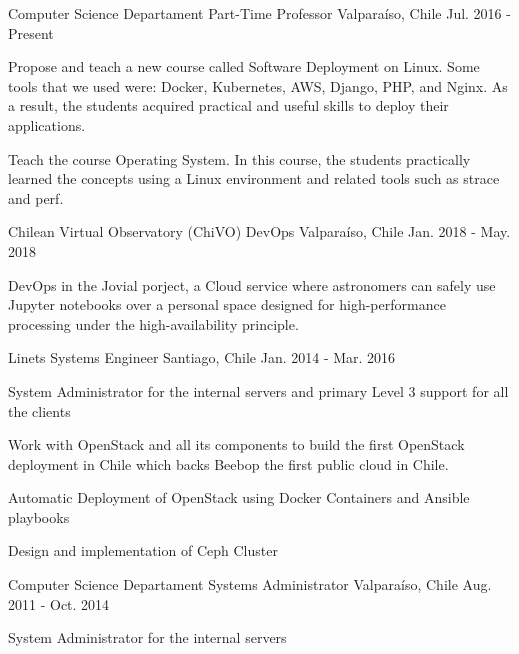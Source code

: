 \begin{cventries}
  \cventry
    {Computer Science Departament}
    {Part-Time Professor}
    {Valparaíso, Chile}
    {Jul. 2016 - Present}
    {
      \begin{cvitems}
        \item {Propose and teach a new course called Software Deployment on Linux. Some tools that we used were: Docker, Kubernetes, AWS, Django, PHP,  and Nginx. As a result, the students acquired practical and useful skills to deploy their applications.}
        \item {Teach the course Operating System. In this course, the students practically learned the concepts using a Linux environment and related tools such as strace and perf.}
      \end{cvitems}
    }
    
    
  \cventry
    {Chilean Virtual Observatory (ChiVO)}
    {DevOps}
    {Valparaíso, Chile}
    {Jan. 2018 - May. 2018}
    {
      \begin{cvitems}
        \item {DevOps in the Jovial porject, a Cloud service where astronomers can safely use Jupyter notebooks over a personal space designed for high-performance processing under the high-availability principle.}
      \end{cvitems}
    }
    

  \cventry
    {Linets}
    {Systems Engineer}    
    {Santiago, Chile}
    {Jan. 2014 - Mar. 2016}
    {
      \begin{cvitems}
        \item {System Administrator for the internal servers and primary Level 3 support for all the clients}
        \item {Work with OpenStack and all its components to build the first OpenStack deployment in Chile which backs Beebop the first public cloud in Chile.}
        \item {Automatic Deployment of OpenStack using Docker Containers and Ansible playbooks}
        \item {Design and implementation of Ceph Cluster}
      \end{cvitems}
    }
    
  \cventry
    {Computer Science Departament}
    {Systems Administrator}    
    {Valparaíso, Chile}
    {Aug. 2011 - Oct. 2014}
    {
      \begin{cvitems}
		\item{System Administrator for the internal servers}
      \end{cvitems}
    }    
\end{cventries}

